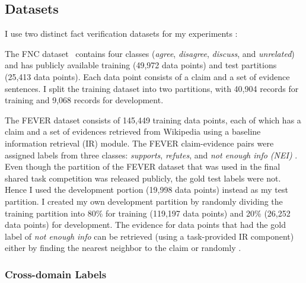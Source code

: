 \documentclass[compsoc,onecolumn]{IEEEtran}
\begin{document}
\subsection{Datasets}
I use two distinct fact verification datasets for my experiments :

{} 
The FNC dataset~\citep*{pomerleau2017fake} contains four classes (\textit{agree}, \textit{disagree}, \textit{discuss}, and \textit{unrelated}) and has publicly available training (49,972 data points) and test partitions (25,413 data points). Each data point consists of a claim and a set of evidence sentences.  I split the training dataset into two partitions, with 40,904 records for training and 9,068 records for development.

{} The FEVER \citep*{thorne2018fever} dataset consists of 145,449 training data points, each of which has a claim and a set of evidences retrieved from Wikipedia using a baseline information retrieval (IR) module.
The FEVER claim-evidence pairs were assigned labels from three classes: \textit{supports}, \textit{refutes}, and \textit{not enough info (NEI)} . Even though the partition of the FEVER dataset that was used in the final shared task competition was released publicly, the gold test labels were not. Hence I used the development portion (19,998 data points) instead as my test partition. I created my own development partition by randomly dividing the training partition into 80\% for training (119,197 data points) and 20\% (26,252 data points) for development.  The evidence for data points that had the gold label of \textit{not enough info} can be retrieved (using a task-provided IR component) either by finding the nearest neighbor to the claim or randomly \citep*{thorne2018fever}. 


\subsubsection{Cross-domain Labels}
\label{sec:crossdomain}
\end{document}
